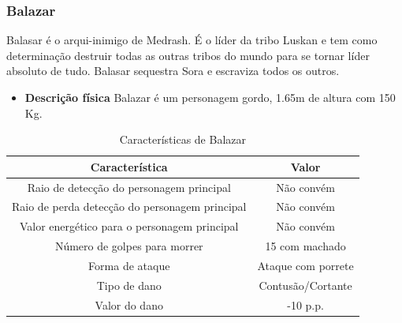 \subsubsection{Balazar}
Balasar é o arqui-inimigo de Medrash. É o líder da tribo Luskan e tem como determinação destruir todas as outras tribos do mundo para se tornar líder absoluto de tudo. Balasar sequestra Sora e escraviza todos os outros.
\begin{itemize}
\item {\bf Descrição física}
Balazar é um personagem gordo, 1.65m de altura com 150 Kg.
\end{itemize}
\newpage
\begin{table}[H]
\begin{center}
\begin{tabular}{|c|c|}
\hline 
\textbf{Característica} & \textbf{Valor} \\ 
\hline 
Raio de detecção do personagem principal & Não convém \\ 
\hline 
Raio de perda detecção do personagem principal & Não convém \\ 
\hline 
Valor energético para o personagem principal & Não convém \\ 
\hline 
Número de golpes para morrer & 15 com machado\\ 
\hline 
Forma de ataque & Ataque com porrete\\ 
\hline 
Tipo de dano &  Contusão/Cortante \\ 
\hline 
Valor do dano & -10 p.p. \\ 
\hline 
\end{tabular} 
\end{center}
\caption{Características de Balazar}
\label{table:balazar}
\end{table}
